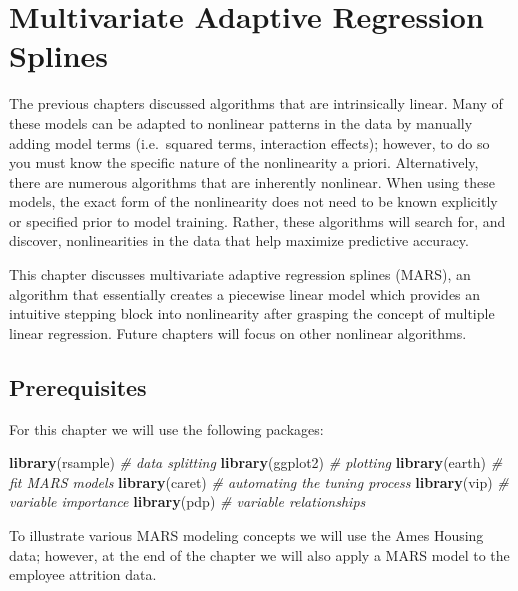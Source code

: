 \documentclass[]{book}
\newenvironment{Shaded}{\begin{snugshade}}{\end{snugshade}}
\newcommand{\CommentTok}[1]{\textcolor[rgb]{0.56,0.35,0.01}{\textit{#1}}}
\newcommand{\KeywordTok}[1]{\textcolor[rgb]{0.13,0.29,0.53}{\textbf{#1}}}
\newcommand{\NormalTok}[1]{#1}
\theoremstyle{definition}
\theoremstyle{definition}
\theoremstyle{definition}
\theoremstyle{remark}
\begin{document}
\hypertarget{MARS}{%
\chapter{Multivariate Adaptive Regression Splines}\label{MARS}}

The previous chapters discussed algorithms that are intrinsically
linear. Many of these models can be adapted to nonlinear patterns in the
data by manually adding model terms (i.e.~squared terms, interaction
effects); however, to do so you must know the specific nature of the
nonlinearity a priori. Alternatively, there are numerous algorithms that
are inherently nonlinear. When using these models, the exact form of the
nonlinearity does not need to be known explicitly or specified prior to
model training. Rather, these algorithms will search for, and discover,
nonlinearities in the data that help maximize predictive accuracy.

This chapter discusses multivariate adaptive regression splines (MARS),
an algorithm that essentially creates a piecewise linear model which
provides an intuitive stepping block into nonlinearity after grasping
the concept of multiple linear regression. Future chapters will focus on
other nonlinear algorithms.

\hypertarget{prerequisites-6}{%
\section{Prerequisites}\label{prerequisites-6}}

For this chapter we will use the following packages:

\begin{Shaded}
\begin{Highlighting}[]
\KeywordTok{library}\NormalTok{(rsample)   }\CommentTok{# data splitting }
\KeywordTok{library}\NormalTok{(ggplot2)   }\CommentTok{# plotting}
\KeywordTok{library}\NormalTok{(earth)     }\CommentTok{# fit MARS models}
\KeywordTok{library}\NormalTok{(caret)     }\CommentTok{# automating the tuning process}
\KeywordTok{library}\NormalTok{(vip)       }\CommentTok{# variable importance}
\KeywordTok{library}\NormalTok{(pdp)       }\CommentTok{# variable relationships}
\end{Highlighting}
\end{Shaded}

To illustrate various MARS modeling concepts we will use the Ames
Housing data; however, at the end of the chapter we will also apply a
MARS model to the employee attrition data.
\end{document}
